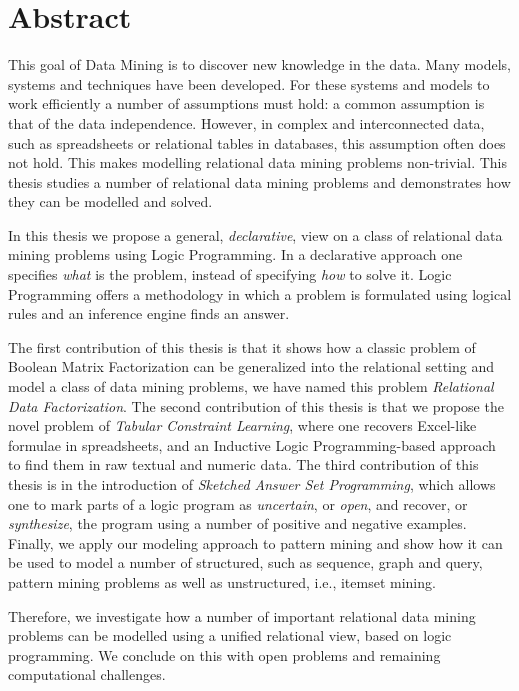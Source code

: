 \chapter{Abstract} \label{ch:abstract}
This goal of Data Mining is to discover new knowledge in the data. Many models, systems and techniques have been developed. For these systems and models to work efficiently a number of assumptions must hold: a common assumption is that of the data independence. However, in complex and interconnected data, such as spreadsheets or relational tables in databases, this assumption often does not hold. This makes modelling relational data mining problems non-trivial. This thesis studies a number of relational data mining problems and demonstrates how they can be modelled and solved.

In this thesis we propose a general, \textit{declarative}, view on a class of relational data mining problems using Logic Programming. In a declarative approach one specifies \textit{what} is the problem, instead of specifying \textit{how} to solve it. Logic Programming offers a methodology in which a problem is formulated using logical rules and an inference engine finds an answer. 

The first contribution of this thesis is that it shows how a classic problem of Boolean Matrix Factorization can be generalized into the relational setting and model a class of data mining problems, we have named this problem \textit{Relational Data Factorization}. The second contribution of this thesis is that we propose the novel problem of \textit{Tabular Constraint Learning}, where one recovers Excel-like formulae in spreadsheets, and an Inductive Logic Programming-based approach to find them in raw textual and numeric data. The third contribution of this thesis is in the introduction of \textit{Sketched Answer Set Programming}, which allows one to mark parts of a logic program as \textit{uncertain}, or \textit{open}, and recover, or \textit{synthesize}, the program using a number of positive and negative examples. Finally, we apply our modeling approach to pattern mining and show how it can be used to model a number of structured, such as sequence, graph and query, pattern mining problems as well as unstructured, i.e., itemset mining. 

Therefore, we investigate how a number of important relational data mining problems can be modelled using a unified relational view, based on logic programming. We conclude on this with open problems and remaining computational challenges.

\cleardoublepage

